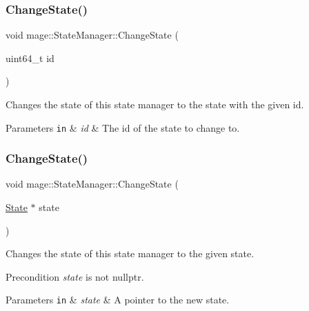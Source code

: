 \subsubsection{\texorpdfstring{Change\+State()}{ChangeState()}\hspace{0.1cm}{\footnotesize\ttfamily [1/2]}}
{\footnotesize\ttfamily void mage\+::\+State\+Manager\+::\+Change\+State (\begin{DoxyParamCaption}\item[{uint64\+\_\+t}]{id }\end{DoxyParamCaption})}

Changes the state of this state manager to the state with the given id.


\begin{DoxyParams}[1]{Parameters}
\mbox{\tt in}  & {\em id} & The id of the state to change to. \\
\hline
\end{DoxyParams}
\hypertarget{classmage_1_1_state_manager_aef491583e2e15f59aec1b98be1406fe5}{}\label{classmage_1_1_state_manager_aef491583e2e15f59aec1b98be1406fe5} 
\subsubsection{\texorpdfstring{Change\+State()}{ChangeState()}\hspace{0.1cm}{\footnotesize\ttfamily [2/2]}}
{\footnotesize\ttfamily void mage\+::\+State\+Manager\+::\+Change\+State (\begin{DoxyParamCaption}\item[{\hyperlink{classmage_1_1_state}{State} $\ast$}]{state }\end{DoxyParamCaption})\hspace{0.3cm}{\ttfamily [protected]}}

Changes the state of this state manager to the given state.

\begin{DoxyPrecond}{Precondition}
{\itshape state} is not {\ttfamily nullptr}. 
\end{DoxyPrecond}

\begin{DoxyParams}[1]{Parameters}
\mbox{\tt in}  & {\em state} & A pointer to the new state. \\
\hline
\end{DoxyParams}
\hypertarget{classmage_1_1_state_manager_ab3a37b1ef0d2e9960ff4c98747c64d3f}{}\label{classmage_1_1_state_manager_ab3a37b1ef0d2e9960ff4c98747c64d3f} 
